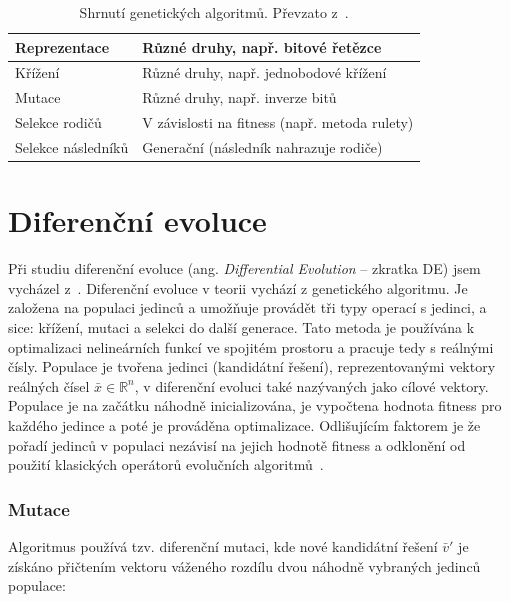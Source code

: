 \begin{table}[htp]
\centering
\caption{Shrnutí genetických algoritmů. Převzato z~\cite{introductionEvo}.}
\label{tab:GA}
\begin{tabular}{|l|l|}
\hline
Reprezentace & Různé druhy, např. bitové řetězce \\ \hline
Křížení & Různé druhy, např. jednobodové křížení \\ \hline
Mutace & Různé druhy, např. inverze bitů \\ \hline
Selekce rodičů & V závislosti na fitness (např. metoda rulety) \\ \hline
Selekce následníků & Generační (následník nahrazuje rodiče) \\ \hline
\end{tabular}
\end{table}



\section{Diferenční evoluce}
Při studiu diferenční evoluce (ang. \emph{Differential Evolution} -- zkratka DE) jsem vycházel z~\cite{DE_GA_TSP, introductionEvo}. Diferenční evoluce v teorii vychází z genetického algoritmu. Je založena na populaci jedinců a umožňuje provádět tři typy operací s jedinci, a sice: křížení, mutaci a selekci do další generace. Tato metoda je používána k optimalizaci nelineárních funkcí ve spojitém prostoru a pracuje tedy s reálnými čísly. Populace je tvořena jedinci (kandidátní řešení), reprezentovanými vektory reálných čísel $\bar{x} \in \mathbb{R}^n$, v diferenční evoluci také nazývaných jako cílové vektory. Populace je na začátku náhodně inicializována, je vypočtena hodnota fitness pro každého jedince a poté je prováděna optimalizace. Odlišujícím faktorem je že pořadí jedinců v populaci nezávisí na jejich hodnotě fitness a odklonění od použití klasických operátorů evolučních algoritmů~\cite{DE_GA_TSP, introductionEvo}.

\subsubsection{Mutace}
Algoritmus používá tzv. diferenční mutaci, kde nové kandidátní řešení $\bar{v}'$ je získáno přičtením vektoru váženého rozdílu dvou náhodně vybraných jedinců populace:

